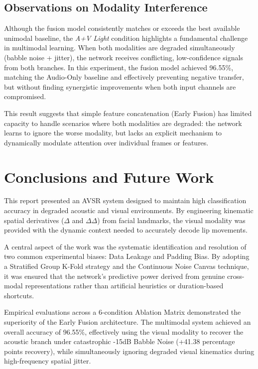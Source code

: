 \documentclass[sigconf,screen,nonacm]{acmart}
\begin{document}
\subsection{Observations on Modality Interference}

Although the fusion model consistently matches or exceeds the best available unimodal baseline, the \textit{A+V Light} condition highlights a fundamental challenge in multimodal learning. When both modalities are degraded simultaneously (babble noise + jitter), the network receives conflicting, low-confidence signals from both branches. In this experiment, the fusion model achieved 96.55\%, matching the Audio-Only baseline and effectively preventing negative transfer, but without finding synergistic improvements when both input channels are compromised.

This result suggests that simple feature concatenation (Early Fusion) has limited capacity to handle scenarios where both modalities are degraded: the network learns to ignore the worse modality, but lacks an explicit mechanism to dynamically modulate attention over individual frames or features.

\section{Conclusions and Future Work}

This report presented an AVSR system designed to maintain high classification accuracy in degraded acoustic and visual environments. By engineering kinematic spatial derivatives ($\Delta$ and $\Delta\Delta$) from facial landmarks, the visual modality was provided with the dynamic context needed to accurately decode lip movements.

A central aspect of the work was the systematic identification and resolution of two common experimental biases: Data Leakage and Padding Bias. By adopting a Stratified Group K-Fold strategy and the Continuous Noise Canvas technique, it was ensured that the network's predictive power derived from genuine cross-modal representations rather than artificial heuristics or duration-based shortcuts.

Empirical evaluations across a 6-condition Ablation Matrix demonstrated the superiority of the Early Fusion architecture. The multimodal system achieved an overall accuracy of 96.55\%, effectively using the visual modality to recover the acoustic branch under catastrophic -15dB Babble Noise (+41.38 percentage points recovery), while simultaneously ignoring degraded visual kinematics during high-frequency spatial jitter.
\end{document}
